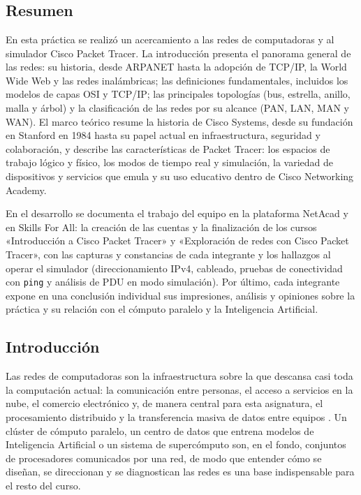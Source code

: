 \chapter{\TituloPracCuatro}
\label{prac:04}

\section{Resumen}
\label{sec:prac04:resumen}

En esta práctica se realizó un acercamiento a las redes de computadoras y al simulador Cisco Packet Tracer. La introducción presenta el panorama general de las redes: su historia, desde ARPANET hasta la adopción de TCP/IP, la World Wide Web y las redes inalámbricas; las definiciones fundamentales, incluidos los modelos de capas OSI y TCP/IP; las principales topologías (bus, estrella, anillo, malla y árbol) y la clasificación de las redes por su alcance (PAN, LAN, MAN y WAN). El marco teórico resume la historia de Cisco Systems, desde su fundación en Stanford en 1984 hasta su papel actual en infraestructura, seguridad y colaboración, y describe las características de Packet Tracer: los espacios de trabajo lógico y físico, los modos de tiempo real y simulación, la variedad de dispositivos y servicios que emula y su uso educativo dentro de Cisco Networking Academy.

En el desarrollo se documenta el trabajo del equipo en la plataforma NetAcad y en Skills For All: la creación de las cuentas y la finalización de los cursos «Introducción a Cisco Packet Tracer» y «Exploración de redes con Cisco Packet Tracer», con las capturas y constancias de cada integrante y los hallazgos al operar el simulador (direccionamiento IPv4, cableado, pruebas de conectividad con \texttt{ping} y análisis de PDU en modo simulación). Por último, cada integrante expone en una conclusión individual sus impresiones, análisis y opiniones sobre la práctica y su relación con el cómputo paralelo y la Inteligencia Artificial.

\section{Introducción}
\label{sec:prac04:introduccion}

Las redes de computadoras son la infraestructura sobre la que descansa casi toda la computación actual: la comunicación entre personas, el acceso a servicios en la nube, el comercio electrónico y, de manera central para esta asignatura, el procesamiento distribuido y la transferencia masiva de datos entre equipos \cite{kurose:computer-networking:2017}. Un clúster de cómputo paralelo, un centro de datos que entrena modelos de Inteligencia Artificial o un sistema de supercómputo son, en el fondo, conjuntos de procesadores comunicados por una red, de modo que entender cómo se diseñan, se direccionan y se diagnostican las redes es una base indispensable para el resto del curso.


